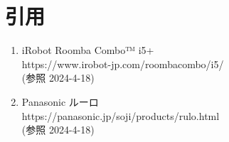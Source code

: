 \documentclass[dvipdfmx]{jsarticle}
\begin{document}
\section{引用}
\begin{enumerate}
\renewcommand{\labelenumi}{[\arabic{enumi}]}
  \item iRobot Roomba Combo™ i5+\\
        https://www.irobot-jp.com/roombacombo/i5/\\
        (参照 2024-4-18)
  \item Panasonic ルーロ\\
        https://panasonic.jp/soji/products/rulo.html\\
        (参照 2024-4-18)
  \end{enumerate}
\end{document}

